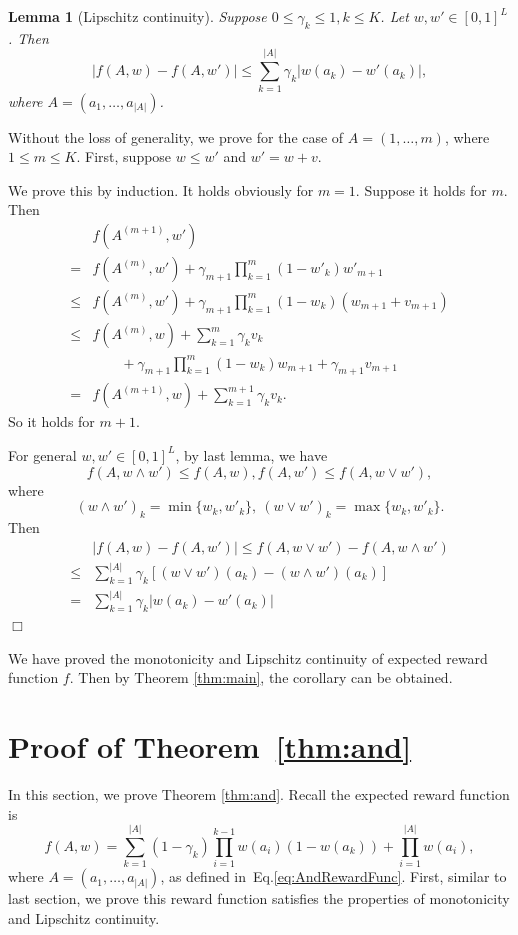 \documentclass{article}
\newcommand{\abs}[1]{\left| #1 \right|}
\newtheorem{lemma}[theorem]{Lemma}%
\newenvironment{proof}{\noindent {\textbf{Proof. }}}{$\Box$ \medskip}
\begin{document}
\begin{lemma}[Lipschitz continuity]
	\label{lem:orLip}
	Suppose $0 \leq \gamma_k \leq 1, k \leq K$. Let $w, w'\in [0,1]^{L}$. Then
	$$
	|f(A, w) - f(A, w')| \leq \sum_{k=1}^{|A|} \gamma_k |w(a_k) - w'(a_k)|,
	$$
	where $A = (a_1, \ldots, a_{|A|})$.
\end{lemma}
\begin{proof}
	Without the loss of generality, we prove for the case of $A = (1, \ldots, m)$, where $1 \leq m \leq K$. First, suppose $w \leq w'$ and $w' = w + v$.
	
	We prove this by induction. It holds obviously for $m = 1$. Suppose it holds for $m$. Then
	\begin{align*}
		&f(A^{(m+1)}, w')\\
		=&f(A^{(m)}, w') + \gamma_{m+1}\prod_{k=1}^m(1 - w'_k) w'_{m+1}\\
		\leq &f(A^{(m)}, w') +  \gamma_{m+1} \prod_{k=1}^m(1 - w_k) (w_{m+1} + v_{m+1})\\
		\leq &f(A^{(m)}, w) + \sum_{k=1}^m \gamma_k v_k \\
		&\qquad + \gamma_{m+1} \prod_{k=1}^m(1 - w_k) w_{m+1} + \gamma_{m+1} v_{m+1}\\
		=& f(A^{(m+1)}, w) + \sum_{k=1}^{m+1} \gamma_k v_k.
	\end{align*}
	So it holds for $m+1$.
	
	For general $w,w' \in [0,1]^L$, by last lemma, we have
	$$
	f(A, w\wedge w') \leq f(A, w), f(A, w') \leq f(A, w\vee w'),
	$$
	where 
	$$
	(w\wedge w')_k = \min\{w_k, w'_k\}, ~ (w\vee w')_k = \max\{w_k, w'_k\}.
	$$
	Then
	\begin{align*}
		&|f(A,w) - f(A,w')| \leq f(A, w\vee w') - f(A, w\wedge w')\\
		\leq & \sum_{k=1}^{|A|} \gamma_k [(w\vee w')(a_k) - (w\wedge w')(a_k)]\\
		=& \sum_{k=1}^{|A|} \gamma_k |w(a_k) - w'(a_k)|
	\end{align*}
\end{proof}

We have proved the monotonicity and Lipschitz continuity of expected reward function $f$. Then by Theorem \ref{thm:main}, the corollary can be obtained.

\section{Proof of Theorem~\ref{thm:and}}

In this section, we prove Theorem \ref{thm:and}. Recall the expected reward function is
$$
f(A,w) = \sum_{k = 1}^{\abs{A}} (1 - \gamma_k) \prod_{i = 1}^{k - 1} w(a_i)(1 - w(a_k)) + \prod_{i=1}^{\abs{A}}w(a_i),
$$
where $A = (a_1, \ldots, a_{|A|})$, as defined in~Eq.\eqref{eq:AndRewardFunc}. First, similar to last section, we prove this reward function satisfies the properties of monotonicity and Lipschitz continuity.
\end{document}
